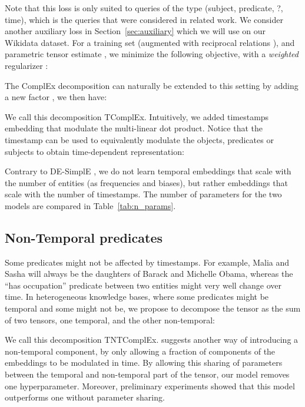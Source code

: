 \documentclass{article}
\begin{document}
Note that this loss is only suited to queries of the type (subject, predicate, ?, time), which is the queries that were considered in related work. We consider another auxiliary loss in Section~\ref{sec:auxiliary} which we will use on our Wikidata dataset.
For a training set  (augmented with reciprocal relations \citep{lacroix2018canonical, kazemi2018simple}), and parametric tensor estimate , we minimize the following objective, with a \emph{weighted} regularizer :


The ComplEx \citep{trouillon_complex_2016} decomposition can naturally be extended to this setting by adding a new factor , we then have:


We call this decomposition TComplEx. Intuitively, we added timestamps embedding that modulate the multi-linear dot product. Notice that the timestamp can be used to equivalently modulate the objects, predicates or subjects to obtain time-dependent representation:


Contrary to DE-SimplE \citep{goel2019diachronic}, we do not learn temporal embeddings that scale with the number of entities (as frequencies and biases), but rather embeddings that scale with the number of timestamps. The number of parameters for the two models are compared in Table~\ref{tab:n_params}.





\subsection{Non-Temporal predicates}
Some predicates might not be affected by timestamps. For example, Malia and Sasha will always be the daughters of Barack and Michelle Obama, whereas the ``has occupation'' predicate between two entities might very well change over time. In heterogeneous knowledge bases, where some predicates might be temporal and some might not be, we propose to decompose the tensor  as the sum of two tensors, one temporal, and the other non-temporal: 



We call this decomposition TNTComplEx. \citet{goel2019diachronic} suggests another way of introducing a non-temporal component, by only allowing a fraction  of components of the embeddings to be modulated in time. By allowing this sharing of parameters between the temporal and non-temporal part of the tensor, our model removes one hyperparameter. Moreover, preliminary experiments showed that this model outperforms one without parameter sharing. 
\end{document}
